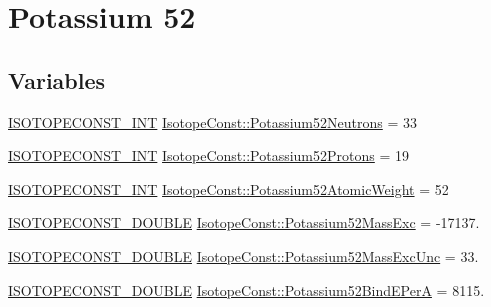 \hypertarget{group___isotope_const-_potassium-_k52}{}\section{Potassium 52}
\label{group___isotope_const-_potassium-_k52}
\subsection*{Variables}
\begin{DoxyCompactItemize}
\item 
\mbox{\hyperlink{group___isotope_const-_macros_ga5f18360b3e99483a35c32d789e62621c}{I\+S\+O\+T\+O\+P\+E\+C\+O\+N\+S\+T\+\_\+\+I\+NT}} \mbox{\hyperlink{group___isotope_const-_potassium-_k52_ga3c8243329d74da322ab53102eaa51484}{Isotope\+Const\+::\+Potassium52\+Neutrons}} = 33
\item 
\mbox{\hyperlink{group___isotope_const-_macros_ga5f18360b3e99483a35c32d789e62621c}{I\+S\+O\+T\+O\+P\+E\+C\+O\+N\+S\+T\+\_\+\+I\+NT}} \mbox{\hyperlink{group___isotope_const-_potassium-_k52_gafc1e5e49b92d9f5a7db5faae7257ad8b}{Isotope\+Const\+::\+Potassium52\+Protons}} = 19
\item 
\mbox{\hyperlink{group___isotope_const-_macros_ga5f18360b3e99483a35c32d789e62621c}{I\+S\+O\+T\+O\+P\+E\+C\+O\+N\+S\+T\+\_\+\+I\+NT}} \mbox{\hyperlink{group___isotope_const-_potassium-_k52_ga100965ef3c99b89f36319d8dd7f45309}{Isotope\+Const\+::\+Potassium52\+Atomic\+Weight}} = 52
\item 
\mbox{\hyperlink{group___isotope_const-_macros_ga8f45a7272ce02c0b4c65c44636ed719a}{I\+S\+O\+T\+O\+P\+E\+C\+O\+N\+S\+T\+\_\+\+D\+O\+U\+B\+LE}} \mbox{\hyperlink{group___isotope_const-_potassium-_k52_ga31b52be1c47f7419cbedcc2a6693085e}{Isotope\+Const\+::\+Potassium52\+Mass\+Exc}} = -\/17137.
\item 
\mbox{\hyperlink{group___isotope_const-_macros_ga8f45a7272ce02c0b4c65c44636ed719a}{I\+S\+O\+T\+O\+P\+E\+C\+O\+N\+S\+T\+\_\+\+D\+O\+U\+B\+LE}} \mbox{\hyperlink{group___isotope_const-_potassium-_k52_ga35475713a01fe597f17e3cde86dbef17}{Isotope\+Const\+::\+Potassium52\+Mass\+Exc\+Unc}} = 33.
\item 
\mbox{\hyperlink{group___isotope_const-_macros_ga8f45a7272ce02c0b4c65c44636ed719a}{I\+S\+O\+T\+O\+P\+E\+C\+O\+N\+S\+T\+\_\+\+D\+O\+U\+B\+LE}} \mbox{\hyperlink{group___isotope_const-_potassium-_k52_ga0e03eeb6932ecc27255fa29a30b8816c}{Isotope\+Const\+::\+Potassium52\+Bind\+E\+PerA}} = 8115.
\item 

\end{DoxyCompactItemize}
